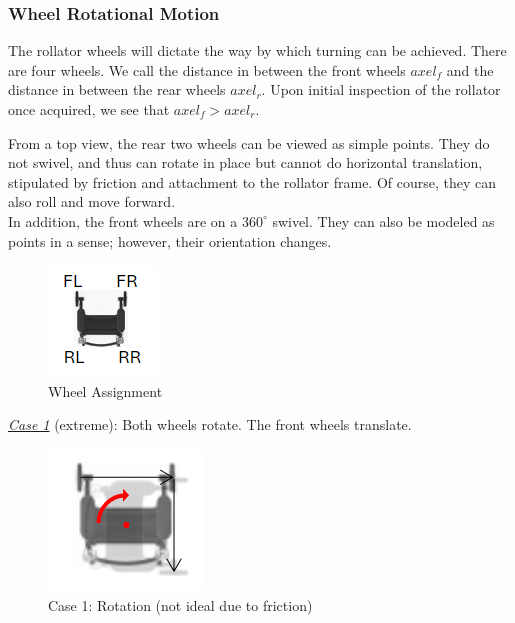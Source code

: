 \subsubsection{Wheel Rotational Motion}
\noindent The rollator wheels will dictate the way by which turning can be achieved. There are four wheels. We call the distance in between the front wheels $axel_f$ and the distance in between the rear wheels $axel_r$. Upon initial inspection of the rollator once acquired, we see that $axel_f > axel_r$.

\noindent From a top view, the rear two wheels can be viewed as simple points. They do not swivel, and thus can rotate in place but cannot do horizontal translation, stipulated by friction and attachment to the rollator frame. Of course, they can also roll and move forward.\\

\noindent In addition, the front wheels are on a $360^{\circ}$ swivel. They can also be modeled as points in a sense; however, their orientation changes.\\

\begin{figure}[H]
	\centering
	\includegraphics[width=.25\textwidth]{./Images/wheel_assignment.png}
	\caption{\label{fig:Wheel_assignment}Wheel Assignment}
\end{figure}

\noindent \underline{\textit{Case 1}} (extreme): Both wheels rotate. The front wheels translate.\\

\begin{figure}[H]
	\centering
	\includegraphics[width=.25\textwidth]{./Images/case1.png}
	\caption{\label{fig:case-one}Case 1: Rotation (not ideal due to friction)}
\end{figure}

